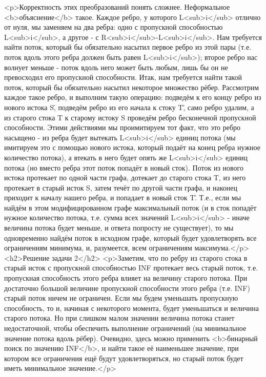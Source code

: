 <p>Корректность этих преобразований понять сложнее. Неформальное <b>объяснение</b> такое. Каждое ребро, у которого L<sub>i</sub> отлично от нуля, мы заменяем на два ребра: одно с пропускной способностью L<sub>i</sub>, а другое - с R<sub>i</sub>-L<sub>i</sub>. Нам требуется найти поток, который бы обязательно насытил первое ребро из этой пары (т.е. поток вдоль этого ребра должен быть равен L<sub>i</sub>); второе ребро нас волнует меньше - поток вдоль него может быть любым, лишь бы он не превосходил его пропускной способности. Итак, нам требуется найти такой поток, который бы обязательно насытил некоторое множество рёбер. Рассмотрим каждое такое ребро, и выполним такую операцию: подведём к его концу ребро из нового истока S\', подведём ребро из его начала к стоку T\', само ребро удалим, а из старого стока T к старому истоку S проведём ребро бесконечной пропускной способности. Этими действиями мы проимитируем тот факт, что это ребро насыщено - из ребра будет вытекать L<sub>i</sub> единиц потока (мы имитируем это с помощью нового истока, который подаёт на конец ребра нужное количество потока), а втекать в него будет опять же L<sub>i</sub> единиц потока (но вместо ребра этот поток попадёт в новый сток). Поток из нового истока протекает по одной части графа, дотекает до старого стока T, из него протекает в старый исток S, затем течёт по другой части графа, и наконец приходит к началу нашего ребра, и попадает в новый сток T\'. Т.е., если мы найдём в этом модифицированном графе максимальный поток (и в сток попадёт нужное количество потока, т.е. сумма всех значений L<sub>i</sub> - иначе величина потока будет меньше, и ответа попросту не существует), то мы одновременно найдём поток в исходном графе, который будет удовлетворять все ограничениям минимума, и, разумеется, всем ограничениям максимума.</p>
<h2>Решение задачи 2</h2>
<p>Заметим, что по ребру из старого стока в старый исток с пропускной способностью INF протекает весь старый поток, т.е. пропускная способность этого ребра влияет на величину старого потока. При достаточно большой величине пропускной способности этого ребра (т.е. INF) старый поток ничем не ограничен. Если мы будем уменьшать пропускную способность, то и, начиная с некоторого момента, будет уменьшаться и величина старого потока. Но при слишком малом значении величина потока станет недостаточной, чтобы обеспечить выполнение ограничений (на минимальное значение потока вдоль рёбер). Очевидно, здесь можно применить <b>бинарный поиск по значению INF</b>, и найти такое её наименьшее значение, при котором все ограничения ещё будут удовлетворяться, но старый поток будет иметь минимальное значение.</p>